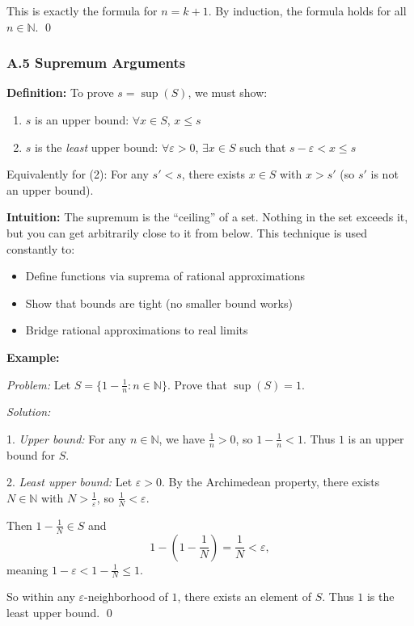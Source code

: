 This is exactly the formula for $n = k+1$. By induction, the formula holds for all $n \in \mathbb{N}$. \qed

\subsubsection*{A.5 Supremum Arguments}

\textbf{Definition:}
To prove $s = \sup(S)$, we must show:
\begin{enumerate}
    \item $s$ is an upper bound: $\forall x \in S$, $x \leq s$
    \item $s$ is the \textit{least} upper bound: $\forall \varepsilon > 0$, $\exists x \in S$ such that $s - \varepsilon < x \leq s$
\end{enumerate}

Equivalently for (2): For any $s' < s$, there exists $x \in S$ with $x > s'$ (so $s'$ is not an upper bound).

\textbf{Intuition:}
The supremum is the ``ceiling'' of a set. Nothing in the set exceeds it, but you can get arbitrarily close to it from below. This technique is used constantly to:
\begin{itemize}
    \item Define functions via suprema of rational approximations
    \item Show that bounds are tight (no smaller bound works)
    \item Bridge rational approximations to real limits
\end{itemize}

\textbf{Example:}

\textit{Problem:} Let $S = \{1 - \frac{1}{n} : n \in \mathbb{N}\}$. Prove that $\sup(S) = 1$.

\textit{Solution:} 

1. \textit{Upper bound:} For any $n \in \mathbb{N}$, we have $\frac{1}{n} > 0$, so $1 - \frac{1}{n} < 1$. Thus $1$ is an upper bound for $S$.

2. \textit{Least upper bound:} Let $\varepsilon > 0$. By the Archimedean property, there exists $N \in \mathbb{N}$ with $N > \frac{1}{\varepsilon}$, so $\frac{1}{N} < \varepsilon$. 

Then $1 - \frac{1}{N} \in S$ and 
\[1 - \left(1 - \frac{1}{N}\right) = \frac{1}{N} < \varepsilon,\]
meaning $1 - \varepsilon < 1 - \frac{1}{N} \leq 1$. 

So within any $\varepsilon$-neighborhood of $1$, there exists an element of $S$. Thus $1$ is the least upper bound. \qed

